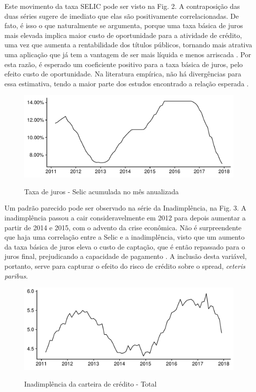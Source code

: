 \documentclass[a4paper, article, 12pt, openany, oneside, english, brazil]{abntex2}
\begin{document}
Este movimento da taxa SELIC pode ser visto na Fig. 2. A contraposição das duas séries sugere de imediato que elas são positivamente correlacionadas. De fato, é isso o que naturalmente se argumenta, porque uma taxa básica de juros mais elevada implica maior custo de oportunidade para a atividade de crédito, uma vez que aumenta a rentabilidade dos títulos públicos, tornando mais atrativa uma aplicação que já tem a vantagem de ser mais líquida e menos arriscada \cite[p.~372]{oliveira2007}. Por esta razão, é esperado um coeficiente positivo para a taxa básica de juros, pelo efeito custo de oportunidade. Na literatura empírica, não há divergências para essa estimativa, tendo a maior parte dos estudos encontrado a relação esperada \cite[p.~233-234]{leal07}.

\begin{figure}[h]
  \centering
    \caption{Taxa de juros - Selic acumulada no mês anualizada}
      \includegraphics[width = \textwidth, scale=0.75]{Selic.pdf}
      \label{selic}
\end{figure}
    
    Um padrão parecido pode ser observado na série da Inadimplência, na Fig. 3. A inadimplência passou a cair consideravelmente em 2012 para depois aumentar a partir de 2014 e 2015, com o advento da crise econômica. Não é surpreendente que haja uma correlação entre a Selic e a inadimplência, visto que um aumento da taxa básica de juros eleva o custo de captação, que é então repassado para o juros final, prejudicando a capacidade de pagamento \cite[p.~390]{oliveira2007}. A inclusão desta variável, portanto, serve para capturar o efeito do risco de crédito sobre o spread, \textit{ceteris paribus}.

\begin{figure}[t]
  \centering
    \caption{Inadimplência da carteira de crédito - Total}
      \includegraphics[width = \textwidth, scale=0.75]{Inadimplencia.pdf}
      \label{inad}
\end{figure}
    
\end{document}
